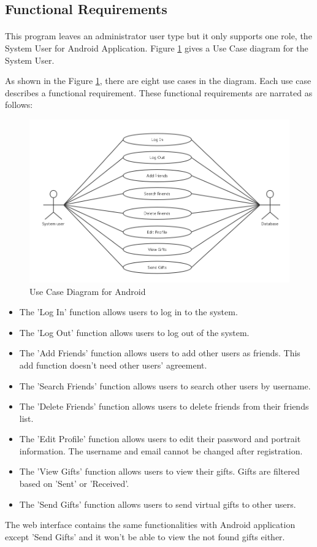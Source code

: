 \subsection{Functional Requirements}
\label{FunctionalRequirements}
\paragraph{}
This program leaves an administrator user type but it only supports one role, the System User for Android Application. Figure \ref{Use Cases Diagram} gives a Use Case diagram for the System User.
\par As shown in the Figure \ref{Use Cases Diagram}, there are eight use cases in the diagram. Each use case describes a functional requirement. These functional requirements are narrated as follows:

\begin{figure}[htb]
\centering
\includegraphics[width=.5\textwidth]{section02/assets/UseCase.png}
\caption[Short Caption 2]{\label{Use Cases Diagram}Use Case Diagram for Android}
\end{figure}

\begin{itemize}
\item The 'Log In' function allows users to log in to the system.
\item The 'Log Out' function allows users to log out of the system.
\item The 'Add Friends' function allows users to add other users as friends. This add function doesn't need other users' agreement.
\item The 'Search Friends' function allows users to search other users by username.
\item The 'Delete Friends' function allows users to delete friends from their friends list.
\item The 'Edit Profile' function allows users to edit their password and portrait information. The username and email cannot be changed after registration. 
\item The 'View Gifts' function allows users to view their gifts. Gifts are filtered based on 'Sent' or 'Received'.
\item The 'Send Gifts' function allows users to send virtual gifts to other users.
\end{itemize}
\par The web interface contains the same functionalities with Android application except 'Send Gifts' and it won't be able to view the not found gifts either.